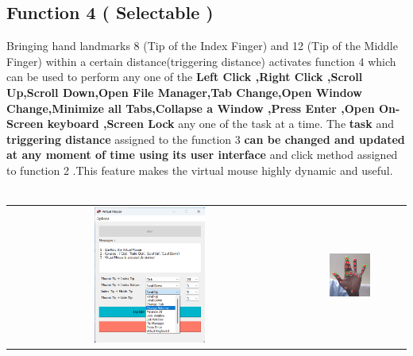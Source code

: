 \documentclass[12pt,a4paper]{report}
\begin{document}
		\subsection{Function 4 ( Selectable )}Bringing hand landmarks 8 (Tip of the Index Finger) and 12 (Tip of the Middle Finger) within a certain distance(triggering distance) activates function 4 which can be used to perform any one of the \textbf{Left Click ,Right Click ,Scroll Up,Scroll Down,Open File Manager,Tab Change,Open Window Change,Minimize all Tabs,Collapse a Window ,Press Enter ,Open On-Screen keyboard ,Screen Lock} any one of the task at a time. The \textbf{task} and \textbf{triggering distance} assigned to the function 3 \textbf{can be changed and updated at any moment of time using its user interface} and click method assigned to function 2 .This feature makes the virtual mouse highly dynamic and useful.
	\\ \\
		    \begin{tabular}{c c}
 \includegraphics[width=0.4\textwidth]{action4f}&
 \includegraphics[width=0.4\textwidth]{action4} 
    \end{tabular}
    		\label{Function 5 ( Selectable )}
\end{document}

